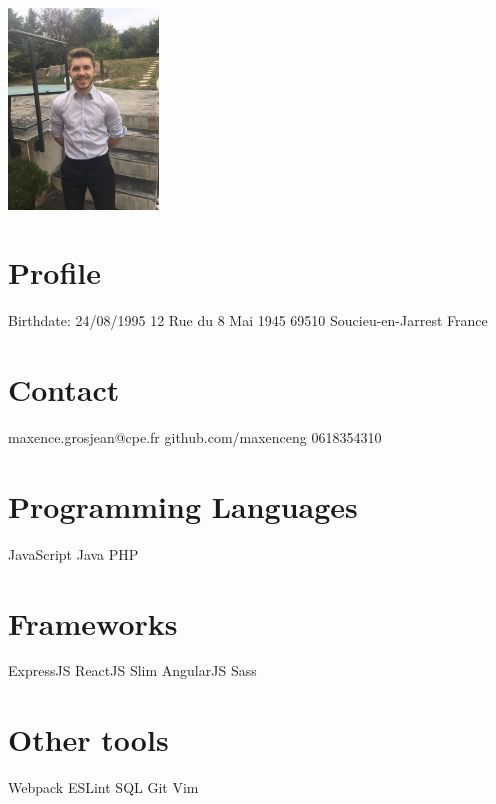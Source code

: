 \documentclass[english]{cv-style}          %
\begin{document}
\lastupdated


\begin{aside}
\includegraphics[width=4cm]{photo}
\section{Profile}
Birthdate: 24/08/1995
12 Rue du 8 Mai 1945
69510 Soucieu-en-Jarrest
France
%
\section{Contact}
maxence.grosjean@cpe.fr
github.com/maxenceng
0618354310
%
\section{Programming Languages}
JavaScript
Java
PHP
%
\section{Frameworks}
ExpressJS
ReactJS
Slim
AngularJS
Sass
%
\section{Other tools}
Webpack
ESLint
SQL
Git
Vim
%
\end{aside}

\end{document}
